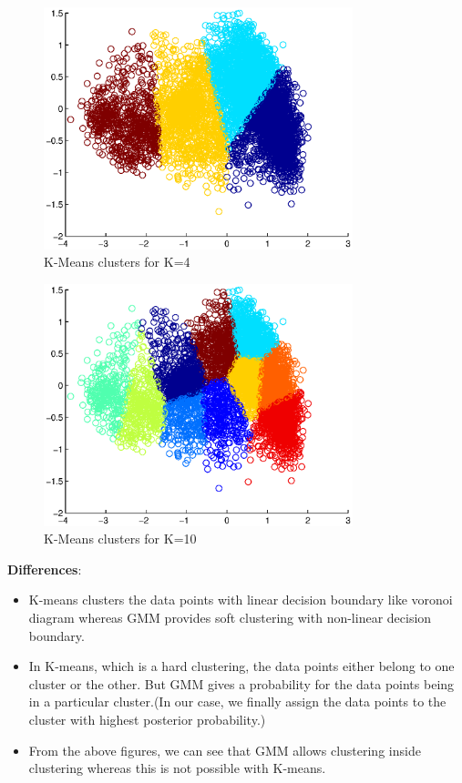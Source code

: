\documentclass[a4paper]{article}
\begin{document}
\begin{enumerate}
		\begin{figure}[H]
			\begin{center}
				\includegraphics[width=0.8\textwidth]{KMEANS_K4.eps}
				\caption{K-Means clusters for K=4}\label{fig:kmeans_k4}
			\end{center}
		\end{figure}
			
		\begin{figure}[H]
			\begin{center}
				\includegraphics[width=0.8\textwidth]{KMEANS_K10.eps}
				\caption{K-Means clusters for K=10}\label{fig:kmeans_k10}
			\end{center}
		\end{figure}
		
		\textbf{Differences}: 
		\begin{itemize}
			\item K-means clusters the data points with linear decision boundary like voronoi diagram whereas GMM provides soft clustering with non-linear decision boundary. 
			\item In K-means, which is a hard clustering, the data points either belong to one cluster or the other. But GMM gives a probability for the data points being in a particular cluster.(In our case, we finally assign the data points to the cluster with highest posterior probability.)
			\item From the above figures, we can see that GMM allows clustering inside clustering whereas this is not possible with K-means.
		\end{itemize}
\end{enumerate}
\end{document}
